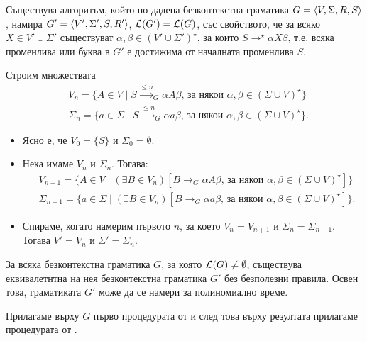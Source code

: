 \begin{lemma}
  \label{lem:useless2}
  Съществува алгоритъм, който по дадена безконтекстна граматика $G = \langle{V,\Sigma,R,S}\rangle$, намира $G' = \langle{V',\Sigma',S,R'}\rangle$, $\mathcal{L}(G') = \mathcal{L}(G)$,
  със свойството, че за всяко $X \in V' \cup \Sigma'$ съществуват $\alpha, \beta \in (V'\cup\Sigma')^\star$,
  за които $S \to^\star \alpha X \beta$,
  т.е. всяка променлива или буква в $G'$ е достижима от началната променлива $S$.
\end{lemma}
\begin{hint}
  Строим множествата
  \begin{align*}
    & V_n = \{A \in V \mid S \stackrel{\leq n}{\to}_G \alpha A \beta\text{, за някои }\alpha,\beta \in (\Sigma \cup V)^\star\}\\
    & \Sigma_n = \{a \in \Sigma \mid S \stackrel{\leq n}{\to}_G \alpha a \beta\text{, за някои }\alpha,\beta \in (\Sigma\cup V)^\star\}.
  \end{align*}
  \begin{itemize}
  \item
    Ясно е, че $V_0 = \{S\}$ и $\Sigma_0 = \emptyset$.
  \item
    Нека имаме $V_n$ и $\Sigma_n$. Тогава:
    \begin{align*}
      & V_{n+1} = \{A \in V \mid (\exists B \in V_n)[ B \to_G \alpha A \beta\text{, за някои }\alpha,\beta \in (\Sigma\cup V)^\star]\}\\
      & \Sigma_{n+1} = \{a \in \Sigma \mid (\exists B \in V_n)[ B \to_G \alpha a \beta\text{, за някои }\alpha,\beta \in (\Sigma\cup V)^\star]\}.
    \end{align*}
  \item
    Спираме, когато намерим първото $n$, за което $V_n = V_{n+1}$ и $\Sigma_n = \Sigma_{n+1}$.
    Тогава $V' = V_n$ и $\Sigma' = \Sigma_n$.
  \end{itemize}
\end{hint}

\begin{thm}
  За всяка безконтекстна граматика $G$, за която $\mathcal{L}(G) \neq \emptyset$, съществува еквивалетнтна на нея безконтекстна граматика $G'$ без безполезни правила.
  Освен това, граматиката $G'$ може да се намери за полиномиално време.
\end{thm}
\begin{hint}
  Прилагаме върху $G$ първо процедурата от  и след това върху резултата прилагаме процедурата от .
\end{hint}

